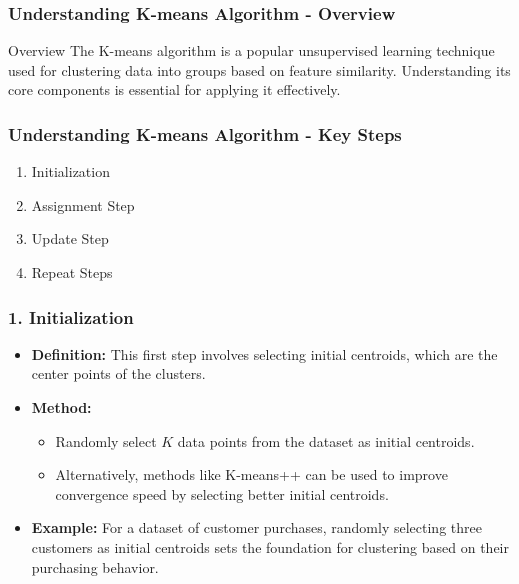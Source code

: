 \documentclass{beamer}
\begin{document}
\begin{frame}[fragile]
    \frametitle{Understanding K-means Algorithm - Overview}
    \begin{block}{Overview}
        The K-means algorithm is a popular unsupervised learning technique used for clustering data into groups based on feature similarity. Understanding its core components is essential for applying it effectively.
    \end{block}
\end{frame}

\begin{frame}[fragile]
    \frametitle{Understanding K-means Algorithm - Key Steps}
    \begin{enumerate}
        \item Initialization
        \item Assignment Step
        \item Update Step
        \item Repeat Steps
    \end{enumerate}
\end{frame}

\begin{frame}[fragile]
    \frametitle{1. Initialization}
    \begin{itemize}
        \item \textbf{Definition:} This first step involves selecting initial centroids, which are the center points of the clusters.
        \item \textbf{Method:} 
        \begin{itemize}
            \item Randomly select $K$ data points from the dataset as initial centroids.
            \item Alternatively, methods like K-means++ can be used to improve convergence speed by selecting better initial centroids.
        \end{itemize}
        \item \textbf{Example:} For a dataset of customer purchases, randomly selecting three customers as initial centroids sets the foundation for clustering based on their purchasing behavior.
    \end{itemize}
\end{frame}
\end{document}
